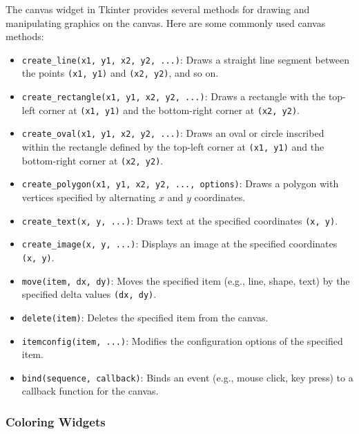 The canvas widget in Tkinter provides several methods for drawing and manipulating graphics on the canvas. Here are some commonly used canvas methods:

\begin{itemize}
    \item \texttt{create\_line(x1, y1, x2, y2, ...)}:
    Draws a straight line segment between the points \texttt{(x1, y1)} and \texttt{(x2, y2)}, and so on.
    
    \item \texttt{create\_rectangle(x1, y1, x2, y2, ...)}:
    Draws a rectangle with the top-left corner at \texttt{(x1, y1)} and the bottom-right corner at \texttt{(x2, y2)}.
    
    \item \texttt{create\_oval(x1, y1, x2, y2, ...)}:
    Draws an oval or circle inscribed within the rectangle defined by the top-left corner at \texttt{(x1, y1)} and the bottom-right corner at \texttt{(x2, y2)}.
    
    \item \texttt{create\_polygon(x1, y1, x2, y2, ..., options)}:
    Draws a polygon with vertices specified by alternating $x$ and $y$ coordinates.
    
    \item \texttt{create\_text(x, y, ...)}:
    Draws text at the specified coordinates \texttt{(x, y)}.
    
    \item \texttt{create\_image(x, y, ...)}:
    Displays an image at the specified coordinates \texttt{(x, y)}.
    
    \item \texttt{move(item, dx, dy)}:
    Moves the specified item (e.g., line, shape, text) by the specified delta values \texttt{(dx, dy)}.
    
    \item \texttt{delete(item)}:
    Deletes the specified item from the canvas.
    
    \item \texttt{itemconfig(item, ...)}:
    Modifies the configuration options of the specified item.
    
    \item \texttt{bind(sequence, callback)}:
    Binds an event (e.g., mouse click, key press) to a callback function for the canvas.
\end{itemize}

\newpage
\subsubsection{Coloring Widgets}

